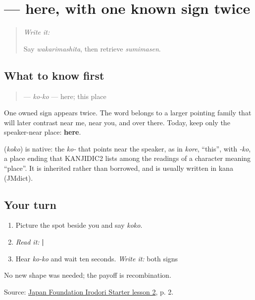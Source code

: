 \section[\texorpdfstring{\ja{ここ} (koko)}{ここ (koko)}]{ — here, with one known sign twice}

\label{lesson:JA-C10-koko}



\begin{quote}
\emph{Write it:} \textbf{}

Say \emph{wakarimashita}, then retrieve \emph{sumimasen}.
\end{quote}

\subsection*{What to know first}
\begin{quote}
\textbf{} — \emph{ko-ko} — here; this place
\end{quote}

One owned sign appears twice. The word belongs to a larger pointing family that will later contrast near me, near you, and over there. Today, keep only the speaker-near place: \textbf{here}.

\begin{cousinweb}
\textbf{} (\emph{koko}) is native: the \emph{ko-} that points near the speaker, as in \emph{kore}, \textquotedblleft{}this\textquotedblright{}, with \emph{-ko}, a place ending that KANJIDIC2 lists among the readings of a character meaning \textquotedblleft{}place\textquotedblright{}. It is inherited rather than borrowed, and is usually written in kana (JMdict).
\end{cousinweb}

\subsection*{Your turn}
\begin{enumerate}
\raggedright
  \item Picture the spot beside you and say \emph{koko}.
  \item \emph{Read it:} \textbf{ | }
  \item Hear \emph{ko-ko} and wait ten seconds. \emph{Write it:} both signs
\end{enumerate}

\begin{tcolorbox}[breakable,colback=teal!4,colframe=teal!35!black,title={Before you move on}]
No new shape was needed; the payoff is recombination.

Source: \href{https://www.irodori.jpf.go.jp/assets/data/starter/pdf/X\_L02.pdf}{Japan Foundation Irodori Starter lesson 2}, p. 2.
\end{tcolorbox}
